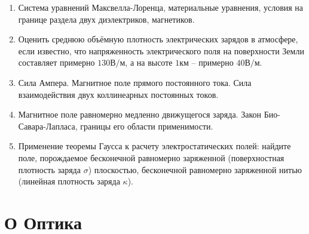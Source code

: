 \documentclass[12pt]{article}
\newcommand{\eL}[1]{\label{Э-#1}}
\def\twodigits#1{%
\ifnum#1<10 0\fi 
\number#1}
\begin{document}
\begin{enumerate}[label={\textbf{Э-\protect\twodigits{\theenumi}}}]
\item\eL{19}
Система уравнений Максвелла-Лоренца, материальные уравнения, условия на границе раздела двух диэлектриков, магнетиков.

\item\eL{20}
Оценить среднюю объёмную плотность электрических зарядов в атмосфере, если известно, что напряженность электрического поля на поверхности Земли составляет примерно $130 \text{В}/\text{м}$, а на высоте $1 \text{км}$ -- примерно $40 \text{В}/\text{м}$.

\item\eL{21}
Сила Ампера. Магнитное поле прямого постоянного тока. Сила взаимодействия двух коллинеарных постоянных токов.

\item\eL{22}
Магнитное поле равномерно медленно движущегося заряда. Закон Био-Савара-Лапласа, границы его области применимости.

\item\eL{23}
Применение теоремы Гаусса к расчету электростатических полей: найдите поле, порождаемое бесконечной равномерно заряженной (поверхностная плотность заряда $\sigma$) плоскостью, бесконечной равномерно заряженной нитью (линейная плотность заряда $\kappa$).

\end{enumerate}

%
\section*{О Оптика}
%
\end{document}
